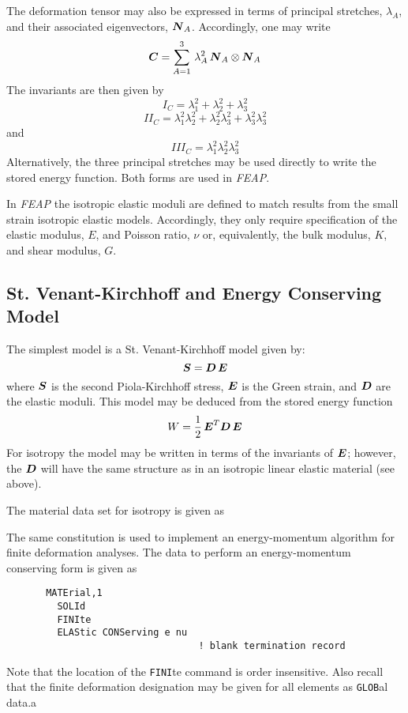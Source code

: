 The deformation tensor may also be expressed in terms of principal
stretches, $\lambda_A$, and their associated eigenvectors, $\boldsymbol{N}_A$.
Accordingly, one may write
\begin{equation}
\boldsymbol{C} = \sum_{A=1}^3 \, \lambda_A^2 \, \boldsymbol{N}_A \otimes \boldsymbol{N}_A
\end{equation}
The invariants
are then given by
\begin{equation}
I_C = \lambda_1^2 + \lambda_2^2 + \lambda_3^2
\end{equation}
\begin{equation}
II_C = \lambda_1^2 \lambda_2^2 + \lambda_2^2 \lambda_3^2
+ \lambda_3^2 \lambda_3^2
\end{equation}
and
\begin{equation}
III_C = \lambda_1^2 \lambda_2^2 \lambda_3^2
\end{equation}
Alternatively, the three principal stretches may be used directly to
write the stored energy function.  Both forms are used in {\sl FEAP}.

In {\sl FEAP} the isotropic elastic moduli are defined to match results from
the small strain isotropic elastic models. Accordingly, they only
require specification of
the elastic modulus, $E$, and Poisson ratio, $\nu$ or, equivalently, the
bulk modulus, $K$, and shear modulus, $G$.

\subsection{St. Venant-Kirchhoff and Energy Conserving Model}

The simplest model is a St. Venant-Kirchhoff model given by:
\begin{equation}
\boldsymbol{S} = \boldsymbol{D} \, \boldsymbol{E}
\end{equation}
where $\boldsymbol{S}$ is the second Piola-Kirchhoff stress, $\boldsymbol{E}$ is the Green
strain, and $\boldsymbol{D}$ are the elastic moduli.
This model may be deduced from the stored energy function
\begin{equation}
W = \frac{1}{2} \, \boldsymbol{E}^T \boldsymbol{D} \, \boldsymbol{E}
\end{equation}
For isotropy the model may be written in terms of the invariants of $\boldsymbol{E}$;
however, the $\boldsymbol{D}$ will have the same structure as in an isotropic linear
elastic material (see above).

The material data set for isotropy is given as

The same constitution is used to implement an energy-momentum
algorithm for finite deformation analyses.  The data to perform an
energy-momentum conserving form is given as
\begin{verbatim}
       MATErial,1
         SOLId
         FINIte
         ELAStic CONServing e nu
                                  ! blank termination record
\end{verbatim}
Note that the location of the {\tt FINI}te command is order insensitive.  Also
recall that the finite deformation designation may be given for all elements
as {\tt GLOB}al data.a

